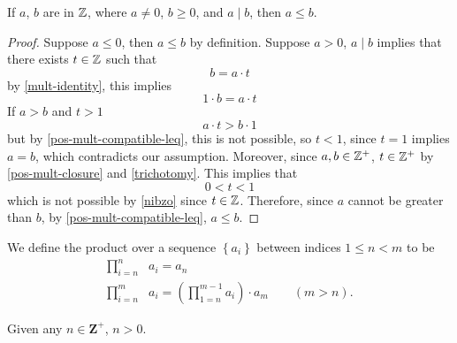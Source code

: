 \begin{lemma} \label{a_div_b_then_a_leq_b}
    If $a$, $b$ are in $\mathbb{Z}$, where $a \neq 0$, $b \geq 0$, and $a \mid b$, then $a \leq b$.  
\end{lemma}

\begin{proof}
    Suppose $a \leq 0$, then $a \leq b$ by definition.
    \newline
    Suppose $a >0$, $a \mid b$ implies that there exists $t \in \mathbb{Z}$ such that
    \[b=a \cdot t\]
    by \ref{mult-identity}, this implies
    \[1 \cdot b=a \cdot t\]
    If $a>b$ and $t>1$ 
    \[a \cdot t > b \cdot 1\]
    but by \ref{pos-mult-compatible-leq}, this is not possible, so $t<1$, since $t=1$ implies $a=b$, which contradicts our assumption. Moreover, since $a,b \in \mathbb{Z}^+$, $t \in \mathbb{Z}^+$ by \ref{pos-mult-closure} and \ref{trichotomy}. This implies that
    \[0<t<1\]
    which is not possible by \ref{nibzo} since $t \in \mathbb{Z}$. Therefore, since $a$ cannot be greater than $b$, by \ref{pos-mult-compatible-leq}, $a \leq b$.
\end{proof}

\begin{definition}\label{def_product_notation}
    We define the product over a sequence $\left\{a_i \right\}$ between indices $1\leq n<m$ to be
    \begin{equation*}
        \begin{aligned}
            \prod_{i=n}^n &a_i=a_n\\
            \prod_{i=n}^m &a_i=\left( \prod_{1=n}^{m-1} a_i \right) \cdot a_m \qquad (m>n).
        \end{aligned}
    \end{equation*}
\end{definition}

\begin{corollary}\label{pos-geq-0}
    Given any $n \in \mathbf{Z}^+$, $n > 0$.
\end{corollary}

